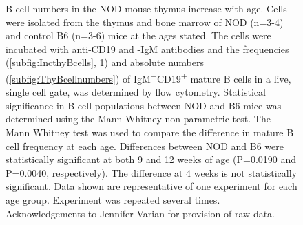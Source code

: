 \begin{figure}
\begin{subfigure}{0.5\textwidth}
	\label{subfig:BMBcells}
	\end{subfigure}
\caption[B cell numbers in the NOD mouse thymus increase with age]{B cell numbers in the NOD mouse thymus increase with age. 
Cells were isolated from the thymus and bone marrow of NOD (n=3-4) and control B6 (n=3-6) mice at the ages stated. The cells were incubated with anti-CD19 and -IgM antibodies and the frequencies (\ref{subfig:IncthyBcells}, \ref{subfig:BMBcells}) and absolute numbers (\ref{subfig:ThyBcellnumbers}) of IgM\textsuperscript{+}CD19\textsuperscript{+} mature B cells in a live, single cell gate, was determined by flow cytometry.
Statistical significance in B cell populations between NOD and B6 mice was determined using the Mann Whitney non-parametric test.
The Mann Whitney test was used to compare the difference in mature B cell frequency at each age. Differences between NOD and B6 were statistically significant at both 9 and 12 weeks of age (P=0.0190 and P=0.0040, respectively). The difference at 4 weeks is not statistically significant.
Data shown are representative of one experiment for each age group. Experiment was repeated several times.
Acknowledgements to Jennifer Varian for provision of raw data.}
\label{fig:IncthyBcells}
\end{figure}

